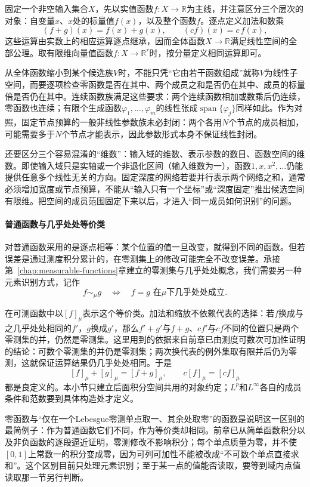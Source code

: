 固定一个非空输入集合$X$，先以实值函数$f:X\to\mathbb R$为主线，并注意区分三个层次的对象：自变量$x$、$x$处的标量值$f(x)$，以及整个函数$f$。逐点定义加法和数乘
\[
  (f+g)(x)=f(x)+g(x),\qquad (cf)(x)=c\,f(x),
\]
这些运算由实数上的相应运算逐点继承，因而全体函数$X\to\mathbb R$满足线性空间的全部公理。取有限维向量值函数$f:X\to\mathbb R^r$时，按分量定义相同运算即可。

从全体函数缩小到某个候选族$V$时，不能只凭“它由若干函数组成”就称$V$为线性子空间，而要逐项检查零函数是否在其中、两个成员之和是否仍在其中、成员的标量倍是否仍在其中。连续函数族满足这些要求：两个连续函数相加或数乘后仍连续，零函数也连续；有限个生成函数$\varphi_1,\ldots,\varphi_m$的线性张成$\operatorname{span}\{\varphi_j\}$同样如此。作为对照，固定节点预算的一般非线性参数族未必封闭：两个各用$N$个节点的成员相加，可能需要多于$N$个节点才能表示，因此参数形式本身不保证线性封闭。

还要区分三个容易混淆的“维数”：输入域的维数、表示参数的数目、函数空间的维数。即使输入域只是实轴或一个非退化区间（输入维数为一），函数$1,x,x^2,\ldots$仍能提供任意多个线性无关的方向。固定深度的网络若要并行表示两个网络之和，通常必须增加宽度或节点预算，不能从“输入只有一个坐标”或“深度固定”推出候选空间有限维。把空间的成员范围固定下来以后，才进入“同一成员如何识别”的问题。

\paragraph{普通函数与几乎处处等价类}

对普通函数采用的是逐点相等：某个位置的值一旦改变，就得到不同的函数。但若误差是通过测度积分累计的，在零测集上的修改可能完全不改变误差。承接第~\ref{chap:measurable-functions}章建立的零测集与几乎处处概念，我们需要另一种元素识别方式，记作
\[
  f\sim_\mu g\quad\Longleftrightarrow\quad f=g\text{ 在$\mu$下几乎处处成立}.
\]

在可测函数中以$[f]_\mu$表示这个等价类。加法和缩放不依赖代表的选择：若$f$换成与之几乎处处相同的$f'$，$g$换成$g'$，那么$f'+g'$与$f+g$、$cf'$与$cf$不同的位置只是两个零测集的并，仍然是零测集。这里用到的依据来自前章已由测度可数次可加性证明的结论：可数个零测集的并仍是零测集；两次换代表的例外集取有限并后仍为零测，这就保证运算结果仍几乎处处相同。于是
\[
  [f]_\mu+[g]_\mu=[f+g]_\mu,\qquad c[f]_\mu=[cf]_\mu
\]
都是良定义的。本小节只建立后面积分空间共用的对象约定；$L^p$和$L^\infty$各自的成员条件和范数要到具体构造处才定义。

零函数与“仅在一个Lebesgue零测单点取一、其余处取零”的函数是说明这一区别的最简例子：作为普通函数它们不同，作为等价类却相同。前章已从简单函数积分以及非负函数的逐段逼近证明，零测修改不影响积分；每个单点质量为零，并不使$[0,1]$上常数一的积分变成零，因为可列可加性不能被改成“不可数个单点直接求和”。这个区别目前只处理元素识别；至于某一点的值能否读取，要等到域内点值读取那一节另行判断。

